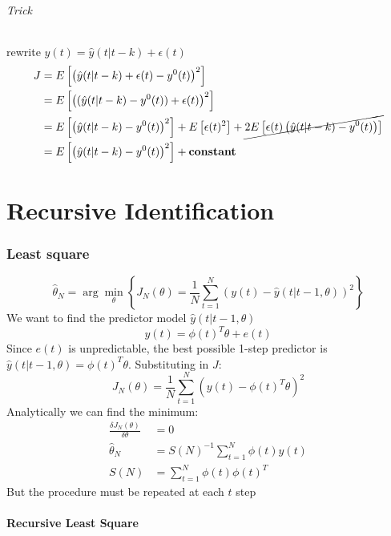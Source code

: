 \documentclass{article}
\let\OldPart\part
\renewcommand{\part}{\newpage\OldPart}
\begin{document}
\paragraph{Trick} rewrite $y(t)=\hat{y}(t|t-k)+\epsilon(t)$
\begin{align*}
J&=E\left[\left(\hat{y}(t|t-k)+\epsilon(t)-y^0(t)\right)^2\right]\\
&=E\left[\left((\hat{y}(t|t-k)-y^0(t))+\epsilon(t)\right)^2\right]\\
&=E\left[\left(
\hat{y}(t|t-k)-y^0(t)\right)^2\right]
+E\left[\epsilon(t)^2\right]
+\cancel{2E\left[\epsilon(t)\left(\hat{y}(t|t-k)-y^0(t)\right)\right]}\\
&=E\left[\left(
\hat{y}(t|t-k)-y^0(t)\right)^2\right]+\textbf{constant}
\end{align*}

\part{Recursive Identification}
\section{Least square}
\[
\hat{\theta}_N=\arg\min_\theta
\left\lbrace
J_N(\theta)=
\frac{1}{N}\sum_{t=1}^{N}
\left(
y(t)-\hat{y}(t|t-1,\theta)
\right)^2
\right\rbrace
\]
We want to find the predictor model $\hat{y}(t|t-1,\theta)$
\[
y(t)=\phi(t)^T\theta+e(t)
\]
Since $e(t)$ is unpredictable, the best possible 1-step predictor is $\hat{y}(t|t-1,\theta)=\phi(t)^T\theta$. Substituting in $J$:
\[
J_N(\theta)=\frac{1}{N}
\sum_{t=1}^N
\left(y(t)-\phi(t)^T\theta\right)^2
\]
Analytically we can find the minimum:
\begin{align*}
\frac{\delta J_N(\theta)}{\delta \theta}&=0\\
\hat{\theta}_N&=S(N)^{-1}\sum_{t=1}^N \phi(t)y(t)\\
S(N)&=\sum_{t=1}^N \phi(t)\phi(t)^T
\end{align*}
But the procedure must be repeated at each $t$ step
\subsection{Recursive Least Square}
\begin{center}
\end{center}
\end{document}
